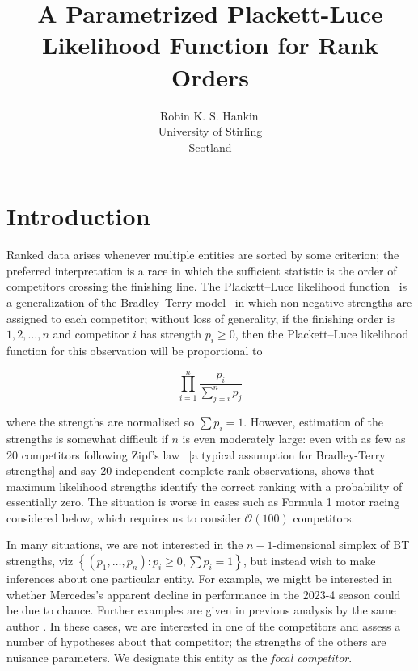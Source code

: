 \documentclass[article]{ajs}  %
\author{Robin K. S. Hankin\,\orcidlink{0000-0001-5982-0415}\\
  University of Stirling\\ Scotland}
\title{A Parametrized Plackett-Luce Likelihood Function for Rank Orders}
\begin{document}

\section{Introduction}

Ranked data arises whenever multiple entities are sorted by some
criterion; the preferred interpretation is a race in which the
sufficient statistic is the order of competitors crossing the
finishing line.  The Plackett--Luce likelihood
function~\citep{luce1959,plackett1975} is a generalization of the
Bradley--Terry model~\citep{bradley1952} in which non-negative
strengths are assigned to each competitor; without loss of generality,
if the finishing order is $1,2,\ldots,n$ and competitor $i$ has
strength $p_i\geqslant 0$, then the Plackett--Luce likelihood function
for this observation will be proportional to

\begin{equation}\label{plackettluce}
\prod_{i=1}^n\frac{p_i}{\sum_{j=i}^np_j}
\end{equation}

\noindent where the strengths are normalised so $\sum p_i=1$.
However, estimation of the strengths is somewhat difficult if $n$ is
even moderately large: even with as few as 20 competitors following
Zipf's law~\citep{zipf1949} [a typical assumption for Bradley-Terry
  strengths] and say 20 independent complete rank observations,
\cite{hankin2017_rmd} shows that maximum likelihood strengths
identify the correct ranking with a probability of essentially zero.
The situation is worse in cases such as Formula 1 motor racing
considered below, which requires us to consider ${\mathcal O}(100)$
competitors.

In many situations, we are not interested in the $n-1$-dimensional
simplex of BT strengths, viz $\left\lbrace(p_1,\ldots,p_n)\colon
p_i\geqslant 0,\sum p_i=1\right\rbrace$, but instead wish to make
inferences about one particular entity.  For example, we might be
interested in whether Mercedes's apparent decline in performance in
the 2023-4 season could be due to chance.  Further examples are given
in previous analysis by the same author \citep{hankin2010,
  hankin2017_rmd, hankin2020, hankin2023_formula1points}.  In these
cases, we are interested in one of the competitors and assess a number
of hypotheses about that competitor; the strengths of the others are
nuisance parameters.  We designate this entity as the {\em focal
 competitor}.
\end{document}
